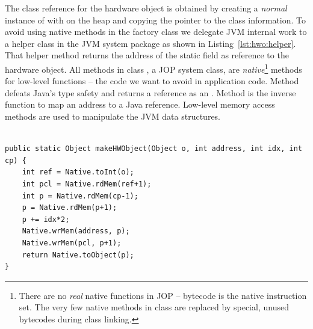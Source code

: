The class reference for the hardware object is obtained by creating a
\emph{normal} instance of  with  on the
heap and copying the pointer to the class information. To avoid using
native methods in the factory class we delegate JVM internal work to
a helper class in the JVM system package as shown in
Listing~\ref{lst:hwo:helper}. That helper method returns the address
of the static field  as reference to the hardware
object. All methods in class , a JOP system class, are
\emph{native}\footnote{There are no \emph{real} native functions in
JOP -- bytecode is the native instruction set. The very few native
methods in class  are replaced by special, unused
bytecodes during class linking.} methods for low-level functions --
the code we want to avoid in application code. Method
 defeats Java's type safety and returns a
reference as an . Method  is the
inverse function to map an address to a Java reference. Low-level
memory access methods are used to manipulate the JVM data structures.

\begin{lstlisting}[float,caption={The helper method in the system class \code{JVMHelp} for the hardware object
creation}, label=lst:hwo:helper]

public static Object makeHWObject(Object o, int address, int idx, int
cp) {
    int ref = Native.toInt(o);
    int pcl = Native.rdMem(ref+1);
    int p = Native.rdMem(cp-1);
    p = Native.rdMem(p+1);
    p += idx*2;
    Native.wrMem(address, p);
    Native.wrMem(pcl, p+1);
    return Native.toObject(p);
}
\end{lstlisting}

